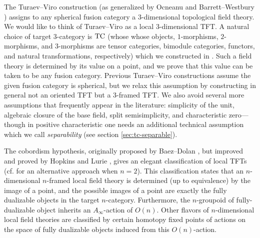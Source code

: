 \documentclass{amsart}
\begin{document}
The Turaev--Viro \cite{MR1191386, MR1292673} construction (as generalized by Ocneanu \cite{MR1317353} and Barrett--Westbury \cite{MR1686423}) assigns to any spherical fusion category a 3-dimensional topological field theory.   We would like to think of Turaev--Viro as a local $3$-dimensional TFT.  A natural choice of target $3$-category is $\mathrm{TC}$ (whose whose objects, $1$-morphisms, $2$-morphisms, and $3$-morphisms are tensor categories, bimodule categories, functors, and natural transformations, respectively) which we constructed in \cite{3TC}.  Such a field theory is determined by its value on a point, and we prove that this value can be taken to be any fusion category.  Previous Turaev--Viro constructions assume the given fusion category is spherical, but we relax this assumption by constructing in general not an oriented TFT but a $3$-framed TFT. %
We also avoid several more assumptions that frequently appear in the literature: simplicity of the unit, algebraic closure of the base field, split semisimplicity, and characteristic zero---though in positive characteristic one needs an additional technical assumption which we call {\em separability} (see section \ref{sec:tc-separable}).

The cobordism hypothesis, originally proposed by Baez--Dolan \cite{MR1355899}, but improved and proved by Hopkins and Lurie \cite{0905.0465}, gives an elegant classification of local TFTs (cf. \cite{schommer-pries-thesis} for an alternative approach when $n=2$).  This classification states that an $n$-dimensional $n$-framed local field theory is determined (up to equivalence) by the image of a point, and the possible images of a point are exactly the fully dualizable objects in the target $n$-category.  Furthermore, the $n$-groupoid of fully-dualizable object inherits an $A_\infty$-action of $O(n)$. Other flavors of $n$-dimensional local field theories are classified by certain homotopy fixed points of actions %
on the space of fully dualizable objects induced from this $O(n)$-action. 
\end{document}
